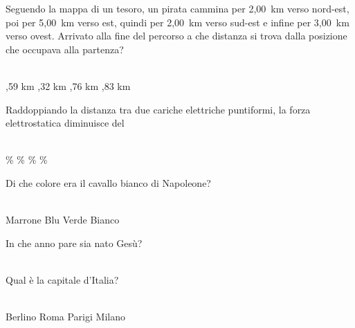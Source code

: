 \documentclass[a4paper,11pt]{exam}
\begin{document}
\begin{questions}
    
\question Seguendo la mappa di un tesoro, un pirata cammina per 2,00~km verso nord-est, poi per 5,00~km verso est, quindi per 2,00~km verso sud-est e infine per 3,00~km verso ovest. Arrivato alla fine del percorso a che distanza si trova dalla posizione che occupava alla partenza?\\\
\begin{oneparchoices}
  ,59 km
  ,32 km
  ,76 km
  \choice 4,83 km
\end{oneparchoices}

    
\question Raddoppiando la distanza tra due cariche elettriche puntiformi, la forza elettrostatica diminuisce del\\\
\begin{oneparchoices}
  \choice 75\%
  \%
  \%
  \%
\end{oneparchoices}

    
\question Di che colore era il cavallo bianco di Napoleone?\\\
\begin{oneparchoices}
  \choice Marrone
  \choice Blu 
  \choice Verde
  \choice Bianco
\end{oneparchoices}

    
\question In che anno pare sia nato Gesù?\\\
\begin{oneparchoices}
  \choice 2019
  \choice -80
  \choice 20
\end{oneparchoices}

    
\question Qual è la capitale d’Italia?\\\
\begin{oneparchoices}
  \choice Berlino
  \choice Roma
  \choice Parigi
  \choice Milano
\end{oneparchoices}


\end{questions}
\end{document}
